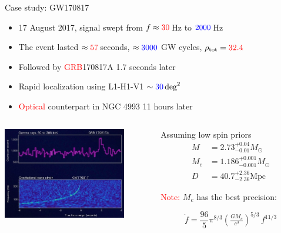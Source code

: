 \documentclass[xcolor=dvipsnames,t]{beamer}
\newcommand{\red}[1]{\textcolor{red}{#1}}
\newcommand{\bl}[1]{\textcolor{blue}{#1}}
\newcommand{\f}{\frac}
\begin{document}
\begin{frame}{Case study: GW170817}
  \begin{itemize}
    \item 17 August 2017, signal swept from $f\approx \red{30}\,$Hz to $\bl{2000}\,$Hz 
    \item The event lasted $\approx \red{57}\,$seconds, $\approx \bl{3000}$ GW cycles, $\rho_\text{tot} = \red{32.4}$
    \item Followed by \red{GRB}170817A 1.7 seconds later
    \item Rapid localization using L1-H1-V1 $\sim \bl{30}\,\text{deg}^2$
    \item \red{Optical} counterpart in NGC 4993 11 hours later
  \end{itemize}  

  \begin{columns}
  \begin{column}{0.5\textwidth}  %
      \begin{center}
      \includegraphics[height=4cm]{figs/GW_GRB170817.jpg}
      \end{center}
  \end{column}
  \begin{column}{0.5\textwidth}
  {
    Assuming low spin priors
    \begin{align*}
     M&=2.73^{+0.04}_{-0.01} M_\odot \\
     M_c &=1.186^{+0.001}_{-0.001}M_\odot  \\ 
     D&=40.7^{+2.36}_{-2.36}\text{Mpc}
    \end{align*}
  }
  {
    \red{Note:} $M_c$ has the best precision: 
   \begin{small}$${\dot{f}} = \f{96}{5}\pi^{8/3} \left(\tfrac{G M_c}{c^3}\right)^{5/3}\, {f^{11/3}}$$ \end{small}
  } 
    
    \end{column}
  \end{columns} 
  
  

\end{frame}
\end{document}
